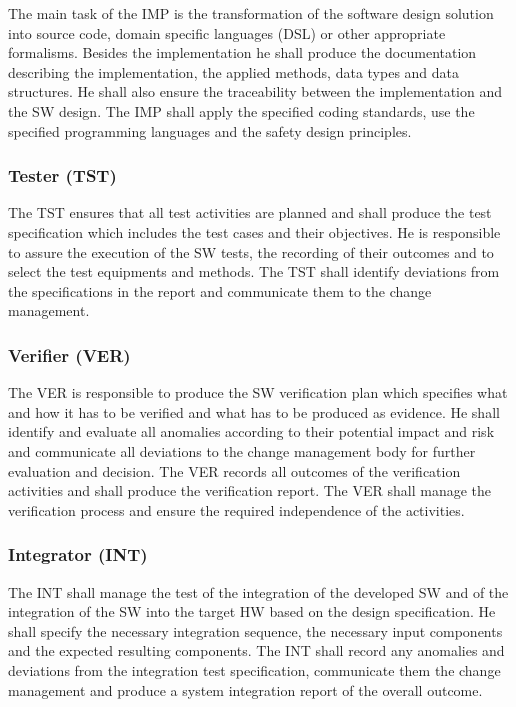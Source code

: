 The main task of the IMP is the transformation of the software design solution
into source code, domain specific languages (DSL) or other appropriate
formalisms. Besides the implementation he shall produce the documentation
describing the implementation, the applied methods, data types and data
structures. He shall also ensure the traceability between the implementation and
the SW design. The IMP shall apply the specified coding standards, use the
specified programming languages and the safety design principles.

\subsubsection{Tester (TST)}
\label{sec:tester}

The TST ensures that all test activities are planned and shall produce the test
specification which includes the test cases and their objectives. He is
responsible to assure the execution of the SW tests, the recording of their
outcomes and to select the test equipments and methods. The TST shall identify
deviations from the specifications in the report and communicate them to the
change management.

\subsubsection{Verifier (VER)}
\label{sec:verifier}

The VER is responsible to produce the SW verification plan which specifies what
and how it has to be verified and what has to be produced as evidence. He shall
identify and evaluate all anomalies according to their potential impact and risk
and communicate all deviations to the change management body for further
evaluation and decision. The VER records all outcomes of the verification
activities and shall produce the verification report. The VER shall manage the
verification process and ensure the required independence of the activities.

\subsubsection{Integrator (INT)}
\label{sec:integrator}

The INT shall manage the test of the integration of the developed SW and of the
integration of the SW into the target HW based on the design specification. He
shall specify the necessary integration sequence, the necessary input components
and the expected resulting components. The INT shall record any anomalies and
deviations from the integration test specification, communicate them the change
management and produce a system integration report of the overall outcome.

